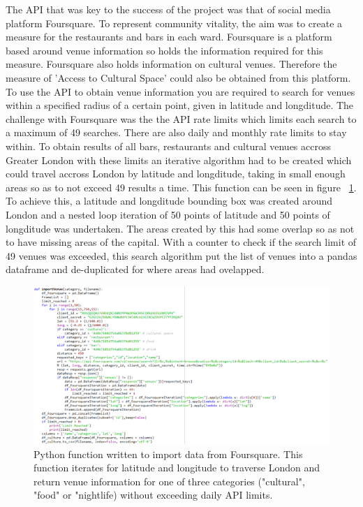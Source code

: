 The API that was key to the success of the project was that of social media platform Foursquare. To represent community vitality, the aim was to create a measure for the restaurants and bars in each ward. Foursquare is a platform based around venue information so holds the information required for this measure. Foursquare also holds information on cultural venues. Therefore the measure of 'Access to Cultural Space' could also be obtained from this platform.
To use the API to obtain venue information you are required to search for venues within a specified radius of a certain point, given in latitude and longditude. The challenge with Foursquare was the the API rate limits which limits each search to a maximum of 49 searches. There are also daily and monthly rate limits to stay within.
To obtain results of all bars, restaurants and cultural venues accross Greater London with these limits an iterative algorithm had to be created which could travel accross London by latitude and longditude, taking in small enough areas so as to not exceed 49 results a time. This function can be seen in figure ~\ref{fig:pyimpfsq}. To achieve this, a latitude and longditude bounding box was created around London and a nested loop iteration of 50 points of latitude and 50 points of longditude was undertaken. The areas created by this had some overlap so as not to have missing areas of the capital. With a counter to check if the search limit of 49 venues was exceeded, this search algorithm put the list of venues into a pandas dataframe and de-duplicated for where areas had ovelapped.


\begin{figure}
\centering
\includegraphics[scale=0.6]{figures/API_import}
\decoRule
\caption{Python function written to import data from Foursquare. This function iterates for latitude and longitude to traverse London and return venue information for one of three categories ("cultural", "food" or "nightlife) without exceeding daily API limits.}
\label {fig:pyimpfsq}
\end{figure}

